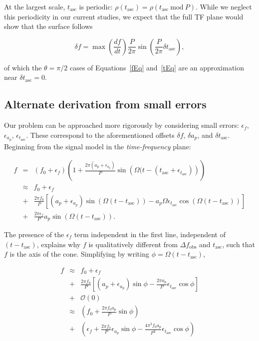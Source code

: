 \documentclass{article}
\begin{document}
At the largest scale, $t_\mathrm{asc}$ is periodic: $\rho(t_\mathrm{asc}) = \rho(t_\mathrm{asc} \mathrm{~mod~} P)$.
While we neglect this periodicity in our current studies, we expect that the full TF plane would show that the surface follows

\begin{equation}
\delta f = \max \left(\frac{df}{dt} \right) \frac{P}{2 \pi} \sin \left(\frac{P}{2 \pi} \delta t_\mathrm{asc} \right),
\end{equation}

\noindent of which the $\theta = \pi/2$ cases of Equations~\ref{fEq} and~\ref{tEq} are an approximation near $\delta t_\mathrm{asc} =0$.

\subsection{Alternate derivation from small errors}

Our problem can be approached more rigorously by considering small errors: $\epsilon_f$, $\epsilon_{a_p}$, $\epsilon_{t_\mathrm{asc}}$.
These correspond to the aforementioned offsets $\delta f$, $\delta a_p$, and $\delta t_\mathrm{asc}$.
Beginning from the signal model in the \textit{time-frequency} plane:


\begin{eqnarray}
f & = & \left(f_0 + \epsilon_f\right) \left( 1 + \frac{2 \pi (a_p + \epsilon_{a_p})}{P}\sin \left(\Omega (t - (t_\mathrm{asc}+\epsilon_{t_\mathrm{asc}}) \right) \right)\\
                   & \approx & f_0 + \epsilon_f \nonumber \\
                   &+& \frac{2\pi f_0}{P} \left[
                     (a_p+\epsilon_{a_p}) \sin(\Omega(t-t_\mathrm{asc}))
                   - a_p \Omega \epsilon_{t_\mathrm{asc}} \cos(\Omega(t-t_\mathrm{asc})) \right]  \nonumber \\
                   &+& \frac{2 \pi \epsilon_f}{P}  a_p  \sin(\Omega ( t-t_\mathrm{asc})).
\end{eqnarray}

The presence of the $\epsilon_f$ term independent in the first line, independent of $(t-t_\mathrm{asc})$, explains why $f$ is qualitatively different from $\Delta f_\mathrm{obs}$ and $t_\mathrm{asc}$, such that $f$ is the axis of the cone.
Simplifying by writing $\phi = \Omega (t- t_\mathrm{asc})$,

\begin{eqnarray}
f &\approx& f_0 + \epsilon_f \nonumber \\
                   &+&\frac{2 \pi f_0}{P}\left[
                     (a_p
                   + \epsilon_{a_p}) \sin \phi
                   - \frac{2 \pi  a_p}{P} \epsilon_{t_\mathrm{asc}} \cos \phi \right] \nonumber \\
                   &+& \mathcal{O}(0) \label{simplePhi}\\
  &\approx& \left(f_0 + \frac{2\pi f_0 a_p}{P} \sin \phi \right) \nonumber \\
  &+& \left(\epsilon_f + \frac{2 \pi f_0}{P} \epsilon_{a_p} \sin\phi - \frac{4 \pi^2 f_0 a_p}{P^2} \epsilon_{t_\mathrm{asc}} \cos\phi\right)
\label{niceApprox}
\end{eqnarray}
\end{document}
